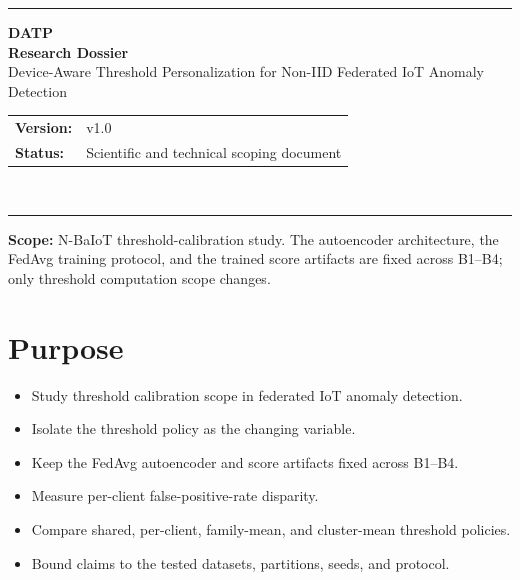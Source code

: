 
{\color{navyhead}\rule{\linewidth}{2pt}}

\begin{center}
  \vspace*{0.25em}
  {\Huge\bfseries\color{navyhead} DATP}\\[0.4em]
  {\Large\bfseries\color{navyhead} Research Dossier}\\[0.6em]
  {\large Device-Aware Threshold Personalization for Non-IID Federated IoT Anomaly Detection}\\[0.75em]
  \small
  \begin{tabular}{@{}ll@{}}
    \textbf{Version:} & v1.0\\[2pt]
    \textbf{Status:}  & Scientific and technical scoping document
  \end{tabular}\\[0.55em]
\end{center}
{\color{navyhead}\rule{\linewidth}{1.2pt}}

\vspace{0.4em}

\begin{tcolorbox}[ambercallout]
\small\textbf{Scope:} N-BaIoT threshold-calibration study.
The autoencoder architecture, the FedAvg training protocol, and the trained score
artifacts are fixed across B1--B4; only threshold computation scope changes.
\end{tcolorbox}

\vspace{0.25em}

\section{Purpose}

\begin{itemize}
  \item Study threshold calibration scope in federated IoT anomaly detection.
  \item Isolate the threshold policy as the changing variable.
  \item Keep the FedAvg autoencoder and score artifacts fixed across B1--B4.
  \item Measure per-client false-positive-rate disparity.
  \item Compare shared, per-client, family-mean, and cluster-mean threshold policies.
  \item Bound claims to the tested datasets, partitions, seeds, and protocol.
\end{itemize}

